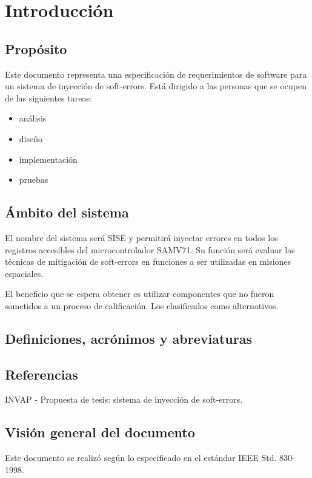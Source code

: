 \chapter{Introducción}

\section{Propósito}

Este documento representa una especificación de requerimientos de software para un sistema de inyección de soft-errors. Está dirigido a las personas que se ocupen de las siguientes tareas:
\begin{itemize}
	\item análisis
	\item diseño
	\item implementación
	\item pruebas
\end{itemize}

\section{Ámbito del sistema}

El nombre del sistema será SISE y permitirá inyectar errores en todos los registros accesibles del microcontrolador SAMV71. Su función será evaluar las técnicas de mitigación de soft-errors en funciones a ser utilizadas en misiones espaciales.

El beneficio que se espera obtener es utilizar componentes que no fueron sometidos a un proceso de calificación. Los clasificados como alternativos.

\section{Definiciones, acrónimos y abreviaturas}

\section{Referencias}

INVAP - Propuesta de tesis: sistema de inyección de soft-errors.

\section{Visión general del documento}

Este documento se realizó según lo especificado en el estándar IEEE Std. 830-1998.